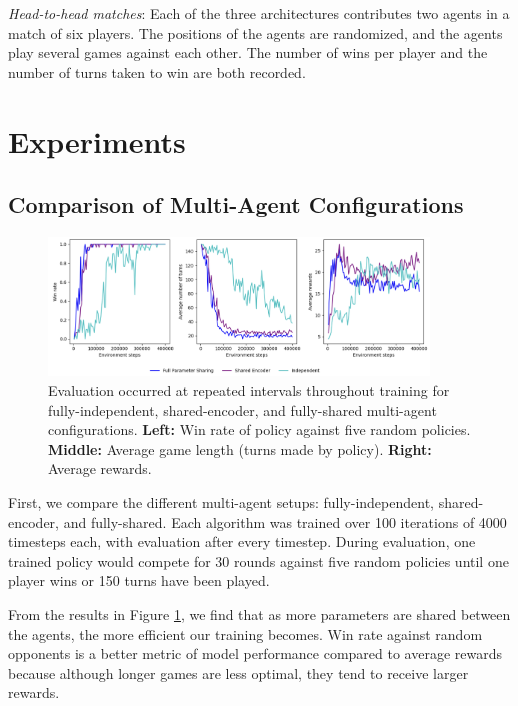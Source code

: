 \documentclass[12pt, a4paper, twocolumn]{article}
\begin{document}
\textit{Head-to-head matches}: Each of the three architectures contributes two agents in a match of six players. The positions of the agents are randomized, and the agents play several games against each other. The number of wins per player and the number of turns taken to win are both recorded.


\section{Experiments}

\subsection{Comparison of Multi-Agent Configurations}


\begin{figure}[t]
  \centering
    \includegraphics[width=0.9\textwidth]{images/comparing_marl.png}
  \caption{Evaluation occurred at repeated intervals throughout training for fully-independent, shared-encoder, and fully-shared multi-agent configurations. \textbf{Left:} Win rate of policy against five random policies. \textbf{Middle:} Average game length (turns made by policy). \textbf{Right:} Average rewards.}\label{fig:win_rate_game_length}
\end{figure}

First, we compare the different multi-agent setups: fully-independent, shared-encoder, and fully-shared. Each algorithm was trained over 100 iterations of 4000 timesteps each, with evaluation after every timestep. During evaluation, one trained policy would compete for 30 rounds against five random policies until one player wins or 150 turns have been played.

From the results in Figure \ref{fig:win_rate_game_length}, we find that as more parameters are shared between the agents, the more efficient our training becomes. Win rate against random opponents is a better metric of model performance compared to average rewards because although longer games are less optimal, they tend to receive larger rewards.
\end{document}
